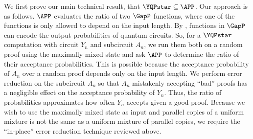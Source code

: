 \documentclass{toc}
\begin{document}
We first prove our main technical result, that $\YQPstar\subseteq \APP$.
Our approach is as follows.
$\APP$ evaluates the ratio of two $\GapP$ functions, where one of the functions
is only allowed to depend on the input length. By , functions
in $\GapP$ can encode the output probabilities of quantum circuits.
So, for a $\YQPstar$ computation with circuit $Y_n$ and subcircuit $A_n$,
we run them both on a random proof using the maximally mixed state
and ask $\APP$ to determine the ratio of their acceptance probabilities.
This is possible because the acceptance probability of $A_n$ over a random proof
depends only on the input length.
We perform error reduction on the subcircuit $A_n$ so that
$A_n$ mistakenly accepting ``bad'' proofs has a negligible effect on the acceptance probability of $Y_n$.
Thus, the ratio of probabilities approximates how often
$Y_n$ accepts given a good proof.
Because we wish to use the maximally mixed state as input
and parallel copies of a uniform mixture
is not the same as a uniform mixture of parallel copies,
we require the ``in-place'' error reduction technique reviewed above.
\end{document}
